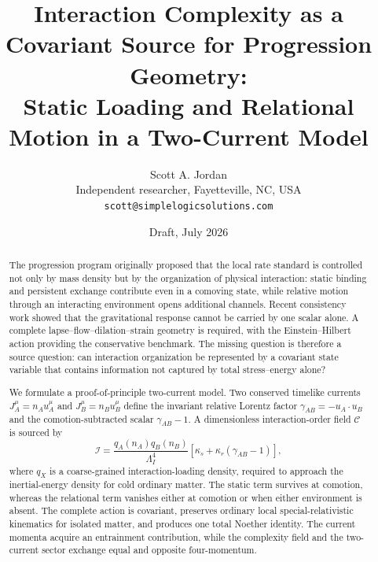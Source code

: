 \documentclass[11pt]{article}
\title{Interaction Complexity as a Covariant Source for Progression Geometry:\\
Static Loading and Relational Motion in a Two-Current Model}
\author{Scott A. Jordan\\
Independent researcher, Fayetteville, NC, USA\\
\texttt{scott@simplelogicsolutions.com}}
\date{Draft, July 2026}
\begin{document}
\maketitle

\begin{abstract}
The progression program originally proposed that the local rate standard is controlled not only by mass density but by the organization of physical interaction: static binding and persistent exchange contribute even in a comoving state, while relative motion through an interacting environment opens additional channels.  Recent consistency work showed that the gravitational response cannot be carried by one scalar alone.  A complete lapse--flow--dilation--strain geometry is required, with the Einstein--Hilbert action providing the conservative benchmark.  The missing question is therefore a source question: can interaction organization be represented by a covariant state variable that contains information not captured by total stress--energy alone?

We formulate a proof-of-principle two-current model.  Two conserved timelike currents $J_A^\mu=n_Au_A^\mu$ and $J_B^\mu=n_Bu_B^\mu$ define the invariant relative Lorentz factor $\gamma_{AB}=-u_A\cdot u_B$ and the comotion-subtracted scalar $\gamma_{AB}-1$.  A dimensionless interaction-order field $\mathcal C$ is sourced by
\[
\mathcal I=\frac{q_A(n_A)q_B(n_B)}{\Lambda_I^4}
\left[\kappa_s+\kappa_r(\gamma_{AB}-1)\right],
\]
where $q_X$ is a coarse-grained interaction-loading density, required to approach the inertial-energy density for cold ordinary matter.  The static term survives at comotion, whereas the relational term vanishes either at comotion or when either environment is absent.  The complete action is covariant, preserves ordinary local special-relativistic kinematics for isolated matter, and produces one total Noether identity.  The current momenta acquire an entrainment contribution, while the complexity field and the two-current sector exchange equal and opposite four-momentum.


\end{abstract}
\end{document}

